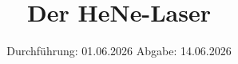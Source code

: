 


\subject{v61}
\title{Der HeNe-Laser}
\date{%
  Durchführung: 01.06.2026
  \hspace{3em}
  Abgabe: 14.06.2026
}



\maketitle
\thispagestyle{empty}
\tableofcontents
\newpage







\printbibliography{}





